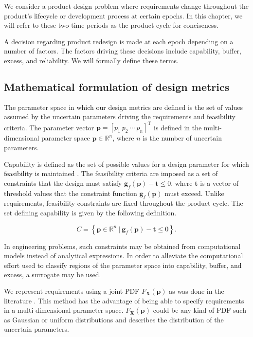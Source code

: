 We consider a product design problem where requirements change throughout the product's lifecycle or development process at certain epochs. In this chapter, we will refer to these two time periods as the product cycle for conciseness.

A decision regarding product redesign is made at each epoch depending on a number of factors. The factors driving these decisions include capability, buffer, excess, and reliability. We will formally define these terms.

\subsection{Mathematical formulation of design metrics} \label{subsec:designmetrics}

The parameter space in which our design metrics are defined is the set of values assumed by the uncertain parameters driving the requirements and feasibility criteria. The parameter vector $\mathbf{p} = \left[p_1 ~ p_2 ~ \cdots ~ p_n\right]^{\mathrm{T}}$ is defined in the multi-dimensional parameter space $\mathbf{p}\in\mathbb{R}^n$, where $n$ is the number of uncertain parameters.

Capability is defined as the set of possible values for a design parameter for which feasibility is maintained \cite{Eckert2019}. The feasibility criteria are imposed as a set of constraints that the design must satisfy $\mathbf{g}_{f}(\mathbf{p}) - \mathbf{t} \le 0$, where $\mathbf{t}$ is a vector of threshold values that the constraint function $\mathbf{g}_{f}(\mathbf{p})$ must exceed. Unlike requirements, feasibility constraints are fixed throughout the product cycle. The set defining capability is given by the following definition.

\begin{equation} \label{eq:capability}
	\textit{C} = \left\{\mathbf{p} \in \mathbb{R}^n~|~\mathbf{g}_{f}(\mathbf{p}) - \mathbf{t} \le 0\right\}.
\end{equation}

In engineering problems, such constraints may be obtained from computational models instead of analytical expressions. In order to alleviate the computational effort used to classify regions of the parameter space into capability, buffer, and excess, a surrogate may be used.

We represent requirements using a joint \acf{PDF} $F_{\mathbf{X}}\left(\mathbf{p}\right)$ as was done in the literature \cite{Villanueva2014,Pradlwarter2005,Frangopol2003a,Zhu2013a}. This method has the advantage of being able to specify requirements in a multi-dimensional parameter space. $F_{\mathbf{X}}\left(\mathbf{p}\right)$ could be any kind of \ac{PDF} such as Gaussian or uniform distributions and describes the distribution of the uncertain parameters.


